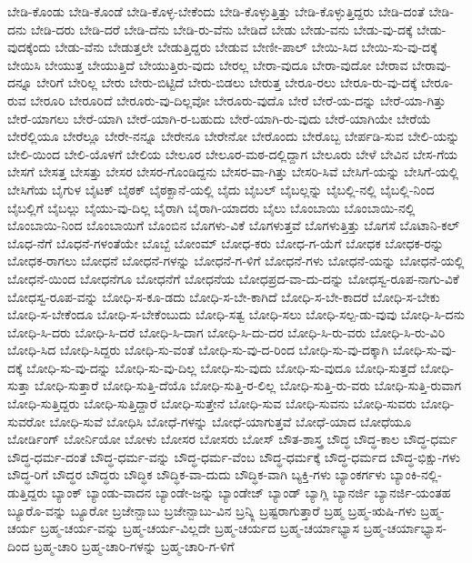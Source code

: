 {ಬೇಡಿ-ಕೊಂಡು
ಬೇಡಿ-ಕೊಂಡೆ
ಬೇಡಿ-ಕೊಳ್ಳ-ಬೇಕೆಂದು
ಬೇಡಿ-ಕೊಳ್ಳುತ್ತಿತ್ತು
ಬೇಡಿ-ಕೊಳ್ಳುತ್ತಿದ್ದರು
ಬೇಡಿ-ದಂತೆ
ಬೇಡಿ-ದನು
ಬೇಡಿ-ದರು
ಬೇಡಿ-ದರೆ
ಬೇಡಿ-ದೆನು
ಬೇಡಿ-ರು-ವೆನು
ಬೇಡಿದೆ
ಬೇಡು
ಬೇಡು-ವನು
ಬೇಡು-ವು-ದಕ್ಕೆ
ಬೇಡು-ವುದಕ್ಕೆಂದು
ಬೇಡು-ವೆನು
ಬೇಡುತ್ತಲೇ
ಬೇಡುತ್ತಿದ್ದರು
ಬೇಡುವ
ಬೇಣೀ-ಪಾಲ್
ಬೇಯಿ-ಸಿದ
ಬೇಯಿ-ಸು-ವು-ದಕ್ಕೆ
ಬೇಯಿಸಿ
ಬೇಯುತ್ತ
ಬೇಯುತ್ತಿದೆ
ಬೇಯುತ್ತಿರು-ವುದು
ಬೇರಲ್ಲ
ಬೇರಾ-ವುದೂ
ಬೇರಾ-ವುದೋ
ಬೇರಾವ
ಬೇರಾವು-ದನ್ನೂ
ಬೇರಿಗೆ
ಬೇರಿಲ್ಲ
ಬೇರು
ಬೇರು-ಬಿಟ್ಟಿದೆ
ಬೇರು-ಬಿಡಲು
ಬೇರುತ್ತ
ಬೇರೂ-ರಲು
ಬೇರೂ-ರು-ವು-ದಕ್ಕೆ
ಬೇರೂ-ರುವ
ಬೇರೂರಿ
ಬೇರೂರಿದೆ
ಬೇರೂರು-ವು-ದಿಲ್ಲವೋ
ಬೇರೂರು-ವುದೊ
ಬೇರೆ
ಬೇರೆ-ಯ-ದನ್ನು
ಬೇರೆ-ಯಾ-ಗಿತ್ತು
ಬೇರೆ-ಯಾಗಲು
ಬೇರೆ-ಯಾಗಿ
ಬೇರೆ-ಯಾಗಿ-ರ-ಬಹುದು
ಬೇರೆ-ಯಾಗಿ-ರು-ವುದು
ಬೇರೆ-ಯಾಗಿಯೇ
ಬೇರೆಯೆ
ಬೇರೆಲ್ಲಿಯೂ
ಬೇರೆಲ್ಲೂ
ಬೇರೇ-ನನ್ನೂ
ಬೇರೇನೂ
ಬೇರೇನೋ
ಬೇರೊಂದು
ಬೇರೊಬ್ಬ
ಬೇರ್ಪಡಿ-ಸುವ
ಬೇಲಿ-ಯನ್ನು
ಬೇಲಿ-ಯಿಂದ
ಬೇಲಿ-ಯೊಳಗೆ
ಬೇಲಿಯ
ಬೇಲೂರ
ಬೇಲೂರ-ಮಠ-ದಲ್ಲಿದ್ದಾಗ
ಬೇಲೂರು
ಬೇಳೆ
ಬೇವಿನ
ಬೇಸ-ಗೆಯ
ಬೇಸಗೆ
ಬೇಸತ್ತ
ಬೇಸತ್ತು
ಬೇಸರ
ಬೇಸರ-ಗೊಂಡಿದ್ದನು
ಬೇಸರ-ವಾ-ಗಿತ್ತು
ಬೇಸರಿ-ಸಿವೆ
ಬೇಸಿಗೆ-ಯನ್ನು
ಬೇಸಿಗೆ-ಯಲ್ಲಿ
ಬೇಸಿಗೆಯ
ಬೈಗುಳ
ಬೈಟಕ್
ಬೈಠಕ್
ಬೈಠಕ್ಖಾನೆ-ಯಲ್ಲಿ
ಬೈದು
ಬೈಬಲ್
ಬೈಬಲ್ಲನ್ನು
ಬೈಬಲ್ಲಿ-ನಲ್ಲಿ
ಬೈಬಲ್ಲಿ-ನಿಂದ
ಬೈಬಲ್ಲಿಗೆ
ಬೈಬಲ್ಲು
ಬೈಯು-ವು-ದಿಲ್ಲ
ಬೈರಾಗಿ
ಬೈರಾಗಿ-ಯಾದರು
ಬೈಲು
ಬೊಂಬಾಯಿ
ಬೊಂಬಾಯಿ-ನಲ್ಲಿ
ಬೊಂಬಾಯಿ-ನಿಂದ
ಬೊಂಬಾಯಿಗೆ
ಬೊಂಬಿನ
ಬೊಗಳು-ವಿಕೆ
ಬೊಗಳುತ್ತವೆ
ಬೊಗಳುತ್ತಿತ್ತು
ಬೊಗಸೆ
ಬೊಟಾನಿ-ಕಲ್
ಬೊಧ-ನೆಗೆ
ಬೊಧನೆ-ಗಳಂತೆಯೇ
ಬೊಬ್ಬೆ
ಬೋಂಮ್
ಬೋಧ-ಕರು
ಬೋಧ-ಗ-ಯೆಗೆ
ಬೋಧಕ
ಬೋಧಕ-ರನ್ನು
ಬೋಧಕ-ರಾಗಲು
ಬೋಧನೆ
ಬೋಧನೆ-ಗಳನ್ನು
ಬೋಧನೆ-ಗ-ಳಿಗೆ
ಬೋಧನೆ-ಗಳು
ಬೋಧನೆ-ಯನ್ನು
ಬೋಧನೆ-ಯಲ್ಲಿ
ಬೋಧನೆ-ಯಿಂದ
ಬೋಧನೆಗೂ
ಬೋಧನೆಗೆ
ಬೋಧನೆಯ
ಬೋಧಪ್ರದ-ವಾ-ದು-ದನ್ನು
ಬೋಧಸ್ವ-ರೂಪ-ನಾಗು-ವಿಕೆ
ಬೋಧಸ್ವ-ರೂಪ-ವನ್ನು
ಬೋಧಿ-ಸ-ಕೂ-ಡದು
ಬೋಧಿ-ಸ-ಬೇ-ಕಾಗಿದೆ
ಬೋಧಿ-ಸ-ಬೇ-ಕಾದರೆ
ಬೋಧಿ-ಸ-ಬೇಕು
ಬೋಧಿ-ಸ-ಬೇಕೆಂದೂ
ಬೋಧಿ-ಸ-ಬೇಕೆಂಬುದು
ಬೋಧಿ-ಸತ್ವ
ಬೋಧಿ-ಸಲು
ಬೋಧಿ-ಸಲ್ಪ-ಡು-ವುವು
ಬೋಧಿ-ಸಿ-ದನು
ಬೋಧಿ-ಸಿ-ದರು
ಬೋಧಿ-ಸಿ-ದರೆ
ಬೋಧಿ-ಸಿ-ದಾಗ
ಬೋಧಿ-ಸಿ-ದು-ದರ
ಬೋಧಿ-ಸಿ-ರು-ವರು
ಬೋಧಿ-ಸಿ-ರು-ವಿರಿ
ಬೋಧಿ-ಸಿದ
ಬೋಧಿ-ಸಿದ್ದರು
ಬೋಧಿ-ಸು-ವಂತೆ
ಬೋಧಿ-ಸು-ವು-ದ-ರಿಂದ
ಬೋಧಿ-ಸು-ವು-ದಕ್ಕಾಗಿ
ಬೋಧಿ-ಸು-ವು-ದಕ್ಕೆ
ಬೋಧಿ-ಸು-ವು-ದನ್ನು
ಬೋಧಿ-ಸು-ವು-ದಿಲ್ಲ
ಬೋಧಿ-ಸು-ವುದು
ಬೋಧಿ-ಸು-ವುದೂ
ಬೋಧಿ-ಸುತ್ತದೆ
ಬೋಧಿ-ಸುತ್ತಾ
ಬೋಧಿ-ಸುತ್ತಾರೆ
ಬೋಧಿ-ಸುತ್ತಿ-ದೆಯೊ
ಬೋಧಿ-ಸುತ್ತಿ-ರ-ಲಿಲ್ಲ
ಬೋಧಿ-ಸುತ್ತಿ-ರು-ವರು
ಬೋಧಿ-ಸುತ್ತಿ-ರುವಾಗ
ಬೋಧಿ-ಸುತ್ತಿದ್ದರು
ಬೋಧಿ-ಸುತ್ತಿದ್ದಾರೆ
ಬೋಧಿ-ಸುತ್ತೇನೆ
ಬೋಧಿ-ಸುವ
ಬೋಧಿ-ಸುವನು
ಬೋಧಿ-ಸುವರು
ಬೋಧಿ-ಸುವರೋ
ಬೋಧಿ-ಸುವೆ
ಬೋಧಿಸಿ
ಬೋಧೆ-ಗಳನ್ನು
ಬೋಧೆ-ಯಾಗುತ್ತವೆ
ಬೋಧೆ-ಯಾದ
ಬೋಧೆಯೂ
ಬೋರ್ಡಿಂಗ್
ಬೋರ್ನಿಯೋ
ಬೋಳು
ಬೋಸರ
ಬೋಸರು
ಬೋಸ್
ಬೌತ-ಶಾಸ್ತ್ರ
ಬೌದ್ಧ
ಬೌದ್ಧ-ಕಾಲ
ಬೌದ್ಧ-ಧರ್ಮ
ಬೌದ್ಧ-ಧರ್ಮ-ದಂತೆ
ಬೌದ್ಧ-ಧರ್ಮ-ವನ್ನು
ಬೌದ್ಧ-ಧರ್ಮ-ವೆಂಬ
ಬೌದ್ಧ-ಧರ್ಮಕ್ಕೆ
ಬೌದ್ಧ-ಧರ್ಮದ
ಬೌದ್ಧ-ಭಿಕ್ಷು-ಗಳು
ಬೌದ್ಧ-ರಿಗೆ
ಬೌದ್ಧರ
ಬೌದ್ಧರು
ಬೌದ್ಧಿಕ
ಬೌದ್ಧಿಕ-ವಾ-ದುದು
ಬೌದ್ಧಿಕ-ವಾಗಿ
ಬ್ಯಕ್ತಿ-ಗಳು
ಬ್ಯಾಂಕರ್ಗಳು
ಬ್ಯಾಂಕಿ-ನಲ್ಲಿ-ಡುತ್ತಿದ್ದರು
ಬ್ಯಾಂಕ್
ಬ್ಯಾಂಡು-ವಾದನ
ಬ್ಯಾಂಡೇ-ಜನ್ನು
ಬ್ಯಾಂಡೇಜ್
ಬ್ಯಾಂಡ್
ಬ್ಯಾಗ್ಲಿ
ಬ್ಯಾನರ್ಜಿ
ಬ್ಯಾನರ್ಜಿ-ಯಂತಹ
ಬ್ಯೂರೊ-ವನ್ನು
ಬ್ಯೂರೋ
ಬ್ರಜೇನ್ಬಾಬು
ಬ್ರಜೇನ್ಬಾಬು-ವಿನ
ಬ್ರನ್ಕ್ಲಿ
ಬ್ರಷ್ಟರಾಗುತ್ತಾರೆ
ಬ್ರಹ್ಮ
ಬ್ರಹ್ಮ-ಋಷಿ-ಗಳು
ಬ್ರಹ್ಮ-ಚರ್ಯ
ಬ್ರಹ್ಮ-ಚರ್ಯ-ವನ್ನು
ಬ್ರಹ್ಮ-ಚರ್ಯ-ವಿಲ್ಲದೇ
ಬ್ರಹ್ಮ-ಚರ್ಯದ
ಬ್ರಹ್ಮ-ಚರ್ಯಾಭ್ಯಾಸ
ಬ್ರಹ್ಮ-ಚರ್ಯಾಭ್ಯಾಸ-ದಿಂದ
ಬ್ರಹ್ಮ-ಚಾರಿ
ಬ್ರಹ್ಮ-ಚಾರಿ-ಗಳನ್ನು
ಬ್ರಹ್ಮ-ಚಾರಿ-ಗ-ಳಿಗೆ
}
